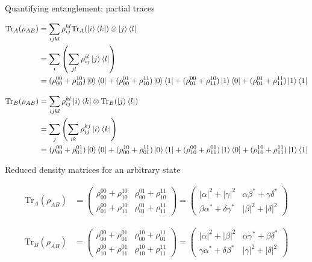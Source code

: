 \documentclass[aspectratio=1610]{beamer}					%
\begin{document}
\begin{frame}{Quantifying entanglement: partial traces}

\begin{align*}
\mathrm{Tr}_{A}(\rho_{AB}) &= \sum_{ijkl} \rho_{ij}^{kl} \mathrm{Tr}_{A}(\ket{i}\bra{k}) \otimes \ket{j}\bra{l}\\
&= \sum_{i} \left(\sum_{jl} \rho_{ij}^{il} \ket{j}\bra{l}\right)\\
&= (\rho_{00}^{00}+\rho_{10}^{10})\ket{0}\bra{0} + (\rho_{00}^{01}+\rho_{10}^{11})\ket{0}\bra{1} + (\rho_{01}^{00}+\rho_{11}^{10})\ket{1}\bra{0} + (\rho_{01}^{01}+\rho_{11}^{11})\ket{1}\bra{1}
\end{align*}

\begin{align*}
\mathrm{Tr}_{B}(\rho_{AB}) &= \sum_{ijkl} \rho_{ij}^{kl} \ket{i}\bra{k} \otimes \mathrm{Tr}_{B}(\ket{j}\bra{l})\\
&= \sum_{j} \left(\sum_{ik} \rho_{ij}^{kj} \ket{i}\bra{k}\right)\\
&= (\rho_{00}^{00}+\rho_{01}^{01})\ket{0}\bra{0} + (\rho_{00}^{10}+\rho_{01}^{11})\ket{0}\bra{1} + (\rho_{10}^{00}+\rho_{11}^{01})\ket{1}\bra{0} + (\rho_{10}^{10}+\rho_{11}^{11})\ket{1}\bra{1}
\end{align*}

\end{frame}

\begin{frame}{Reduced density matrices for an arbitrary state}

\begin{align*}
\mathrm{Tr}_{A}(\rho_{AB}) &=
\begin{pmatrix}
\rho_{00}^{00}+\rho_{10}^{10} & \rho_{00}^{01}+\rho_{10}^{11}\\
\rho_{01}^{00}+\rho_{11}^{10} & \rho_{01}^{01}+\rho_{11}^{11}
\end{pmatrix}
= \begin{pmatrix}
|\alpha|^{2} + |\gamma|^{2} & \alpha\beta^{*} + \gamma\delta^{*}\\
\beta\alpha^{*} + \delta\gamma^{*} & |\beta|^{2} + |\delta|^{2}
\end{pmatrix}
\end{align*}

\begin{align*}
\mathrm{Tr}_{B}(\rho_{AB}) &=
\begin{pmatrix}
\rho_{00}^{00}+\rho_{01}^{01} & \rho_{00}^{10}+\rho_{01}^{11}\\
\rho_{10}^{00}+\rho_{11}^{01} & \rho_{10}^{10}+\rho_{11}^{11}
\end{pmatrix}
= \begin{pmatrix}
|\alpha|^{2} + |\beta|^{2} & \alpha\gamma^{*} + \beta\delta^{*}\\
\gamma\alpha^{*} + \delta\beta^{*} & |\gamma|^{2} + |\delta|^{2}
\end{pmatrix}
\end{align*}

\end{frame}
\end{document}
